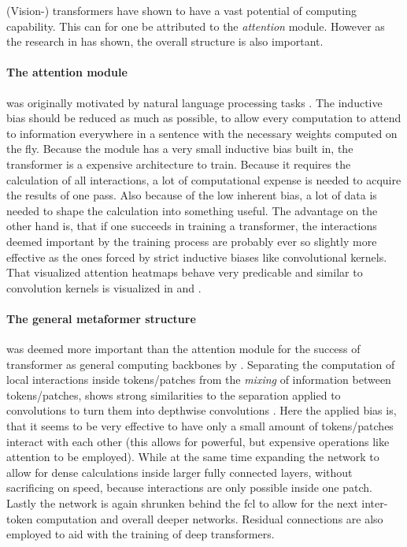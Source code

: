 (Vision-) transformers have shown to have a vast potential of computing capability. 
This can for one be attributed to the \emph{attention} module. 
However as the research in \cite{metaformerPaper} has shown, the overall structure is also important.

\paragraph{The attention module} was originally motivated by natural language processing tasks \cite{attentionIsAllYouNeed}. The inductive bias should be reduced as much as possible, to allow every computation to attend to information everywhere in a sentence with the necessary weights computed on the fly.
Because the module has a very small inductive bias built in, the transformer is a expensive architecture to train. 
Because it requires the calculation of all interactions, a lot of computational expense is needed to acquire the results of one pass.
Also because of the low inherent bias, a lot of data is needed to shape the calculation into something useful.
The advantage on the other hand is, that if one succeeds in training a transformer, the interactions deemed important by the training process are probably ever so slightly more effective as the ones forced by strict inductive biases like convolutional kernels. That visualized attention heatmaps behave very predicable and similar to convolution kernels is visualized in \cite{dinoPaper} and \cite{imageWorth16x16}.

\paragraph{The general metaformer structure} was deemed more important than the attention module for the success of transformer as general computing backbones by \cite{metaformerPaper}.
Separating the computation of local interactions inside tokens/patches from the \emph{mixing} of information between tokens/patches, shows strong similarities to the separation applied to convolutions to turn them into depthwise convolutions \cite{mobileNetPaper}.
Here the applied bias is, that it seems to be very effective to have only a small amount of tokens/patches interact with each other (this allows for powerful, but expensive operations like attention to be employed).
While at the same time expanding the network to allow for dense calculations inside larger fully connected layers, without sacrificing on speed, because interactions are only possible inside one patch.
Lastly the network is again shrunken behind the fcl to allow for the next inter-token computation and overall deeper networks.
Residual connections are also employed to aid with the training of deep transformers.

